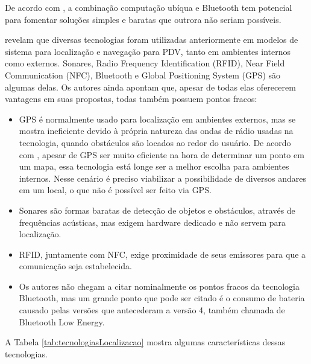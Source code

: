 \documentclass[english,brazilian]{UNISINOSmonografia}
\begin{document}
De acordo com , a combinação computação ubíqua e Bluetooth tem potencial para fomentar soluções simples e baratas que outrora não seriam possíveis.

 revelam que diversas tecnologias foram utilizadas anteriormente em modelos de sistema para localização e navegação para PDV, tanto em ambientes internos como externos. Sonares, Radio Frequency Identification (RFID), Near Field Communication (NFC), Bluetooth e Global Positioning System (GPS) são algumas delas. Os autores ainda apontam que, apesar de todas elas oferecerem vantagens em suas propostas, todas também possuem pontos fracos:

\begin{itemize}
  \item GPS é normalmente usado para localização em ambientes externos, mas se mostra ineficiente devido à própria natureza das ondas de rádio usadas na tecnologia, quando obstáculos são locados ao redor do usuário. De acordo com , apesar de GPS ser muito eficiente na hora de determinar um ponto em um mapa, essa tecnologia está longe ser a melhor escolha para ambientes internos. Nesse cenário é preciso viabilizar a possibilidade de diversos andares em um local, o que não é possível ser feito via GPS.
  \item Sonares são formas baratas de detecção de objetos e obstáculos, através de frequências acústicas, mas exigem hardware dedicado e não servem para localização.
  \item RFID, juntamente com NFC, exige proximidade de seus emissores para que a comunicação seja estabelecida.
  \item Os autores não chegam a citar nominalmente os pontos fracos da tecnologia Bluetooth, mas um grande ponto que pode ser citado é o consumo de bateria causado pelas versões que antecederam a versão 4, também chamada de Bluetooth Low Energy.
\end{itemize}

A Tabela \ref{tab:tecnologiasLocalizacao} mostra algumas características dessas tecnologias.
\end{document}
